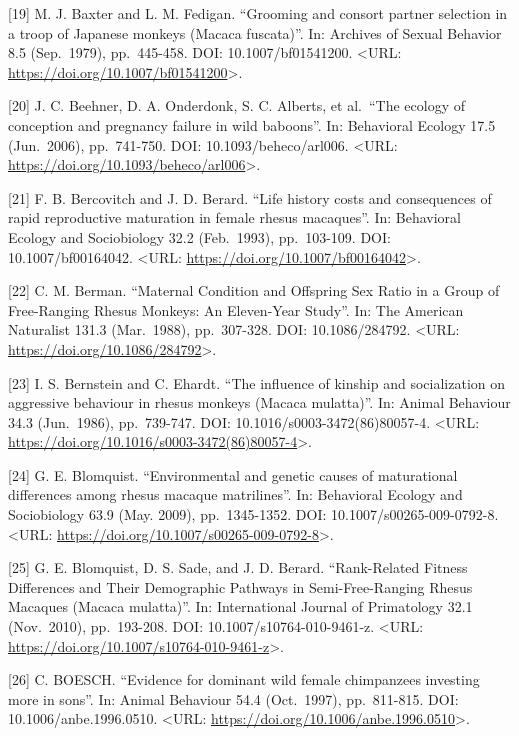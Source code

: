 \documentclass[
]{article}
\begin{document}
{[}19{]} M. J. Baxter and L. M. Fedigan. ``Grooming and consort partner
selection in a troop of Japanese monkeys (Macaca fuscata)''. In:
Archives of Sexual Behavior 8.5 (Sep.~1979), pp.~445-458. DOI:
10.1007/bf01541200. \textless URL:
\url{https://doi.org/10.1007/bf01541200}\textgreater.

{[}20{]} J. C. Beehner, D. A. Onderdonk, S. C. Alberts, et al.~``The
ecology of conception and pregnancy failure in wild baboons''. In:
Behavioral Ecology 17.5 (Jun.~2006), pp.~741-750. DOI:
10.1093/beheco/arl006. \textless URL:
\url{https://doi.org/10.1093/beheco/arl006}\textgreater.

{[}21{]} F. B. Bercovitch and J. D. Berard. ``Life history costs and
consequences of rapid reproductive maturation in female rhesus
macaques''. In: Behavioral Ecology and Sociobiology 32.2 (Feb.~1993),
pp.~103-109. DOI: 10.1007/bf00164042. \textless URL:
\url{https://doi.org/10.1007/bf00164042}\textgreater.

{[}22{]} C. M. Berman. ``Maternal Condition and Offspring Sex Ratio in a
Group of Free-Ranging Rhesus Monkeys: An Eleven-Year Study''. In: The
American Naturalist 131.3 (Mar.~1988), pp.~307-328. DOI: 10.1086/284792.
\textless URL: \url{https://doi.org/10.1086/284792}\textgreater.

{[}23{]} I. S. Bernstein and C. Ehardt. ``The influence of kinship and
socialization on aggressive behaviour in rhesus monkeys (Macaca
mulatta)''. In: Animal Behaviour 34.3 (Jun.~1986), pp.~739-747. DOI:
10.1016/s0003-3472(86)80057-4. \textless URL:
\url{https://doi.org/10.1016/s0003-3472(86)80057-4}\textgreater.

{[}24{]} G. E. Blomquist. ``Environmental and genetic causes of
maturational differences among rhesus macaque matrilines''. In:
Behavioral Ecology and Sociobiology 63.9 (May. 2009), pp.~1345-1352.
DOI: 10.1007/s00265-009-0792-8. \textless URL:
\url{https://doi.org/10.1007/s00265-009-0792-8}\textgreater.

{[}25{]} G. E. Blomquist, D. S. Sade, and J. D. Berard. ``Rank-Related
Fitness Differences and Their Demographic Pathways in Semi-Free-Ranging
Rhesus Macaques (Macaca mulatta)''. In: International Journal of
Primatology 32.1 (Nov.~2010), pp.~193-208. DOI:
10.1007/s10764-010-9461-z. \textless URL:
\url{https://doi.org/10.1007/s10764-010-9461-z}\textgreater.

{[}26{]} C. BOESCH. ``Evidence for dominant wild female chimpanzees
investing more in sons''. In: Animal Behaviour 54.4 (Oct.~1997),
pp.~811-815. DOI: 10.1006/anbe.1996.0510. \textless URL:
\url{https://doi.org/10.1006/anbe.1996.0510}\textgreater.
\end{document}
